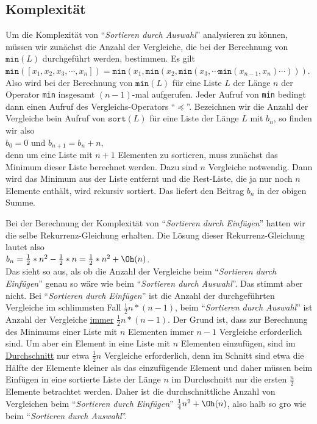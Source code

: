 \subsection{Komplexit\"at}
Um die Komplexit\"at von ``\emph{Sortieren durch Auswahl}'' analysieren zu k\"onnen, m\"ussen
wir zun\"achst die Anzahl der Vergleiche, die bei der Berechnung von $\mathtt{min}(L)$
durchgef\"uhrt werden, bestimmen.  Es gilt \\[0.1cm]
\hspace*{1.3cm} 
$\mathtt{min}([x_1,x_2,x_3,\cdots,x_n]) = \mathtt{min}(x_1, \mathtt{min}(x_2, \mathtt{min}(x_3, \cdots \mathtt{min}(x_{n-1},x_n) \cdots )))$. 
\\[0.1cm]
Also wird bei der Berechnung von $\texttt{min}(L)$ f\"ur eine Liste $L$ der L\"ange $n$ der Operator
\texttt{min} insgesamt $(n-1)$-mal aufgerufen.  Jeder Aufruf von \texttt{min} bedingt dann
einen Aufruf des Vergleichs-Operators ``$\preceq$''.
Bezeichnen wir die Anzahl der Vergleiche bein Aufruf von $\texttt{sort}(L)$ f\"ur eine
Liste der L\"ange $L$ mit $b_n$, so finden wir also \\[0.1cm]
\hspace*{1.3cm} $b_0 = 0$ \quad und \quad $b_{n+1} = b_n + n$, \hspace*{\fill}\\[0.1cm]
denn um eine Liste mit $n+1$ Elementen zu sortieren, muss zun\"achst das Minimum dieser
Liste berechnet werden.  Dazu sind $n$ Vergleiche notwendig.  Dann wird das Minimum aus
der Liste entfernt und die Rest-Liste, die ja nur noch $n$ Elemente enth\"alt, wird rekursiv
sortiert.  Das liefert den Beitrag $b_n$ in der obigen Summe.

Bei der Berechnung der Komplexit\"at von ``\emph{Sortieren durch Einf\"ugen}'' hatten wir die
selbe Rekurrenz-Gleichung erhalten.  Die L\"osung dieser Rekurrenz-Gleichung lautet also \\[0.1cm]
\hspace*{1.3cm} $b_n = \frac{1}{2} * n^2 - \frac{1}{2}* n = \frac{1}{2} * n^2 + \Oh(n)$. \\[0.1cm]
Das sieht so aus, als ob die Anzahl der Vergleiche beim ``\emph{Sortieren durch
  Einf\"ugen}'' genau so w\"are wie beim ``\emph{Sortieren durch Auswahl}''.  Das stimmt aber
nicht.  Bei ``\emph{Sortieren durch Einf\"ugen}'' ist die Anzahl der durchgef\"uhrten
Vergleiche im schlimmsten Fall $\frac{1}{2}n*(n-1)$, beim ``\emph{Sortieren durch
  Auswahl}'' ist Anzahl der Vergleiche \underline{immer} $\frac{1}{2}n*(n-1)$.  Der Grund
ist, dass zur Berechnung des Minimums einer Liste mit $n$ Elementen immer $n-1$ Vergleiche
erforderlich sind.  Um aber ein Element in eine Liste mit $n$ Elementen einzuf\"ugen, sind
im \underline{Durchschnitt} nur etwa $\frac{1}{2}n$ Vergleiche erforderlich, denn im Schnitt sind etwa
die H\"alfte der Elemente kleiner als das einzuf\"ugende Element und daher m\"ussen beim Einf\"ugen
in eine sortierte Liste der L\"ange $n$ im Durchschnitt nur die ersten $\frac{n}{2}$
Elemente betrachtet werden.  Daher ist die durchschnittliche Anzahl von Vergleichen beim
``\emph{Sortieren durch Einf\"ugen}'' $\frac{1}{4}n^2 + \Oh(n)$, also halb so gro\3 wie beim
``\emph{Sortieren durch Auswahl}''.


